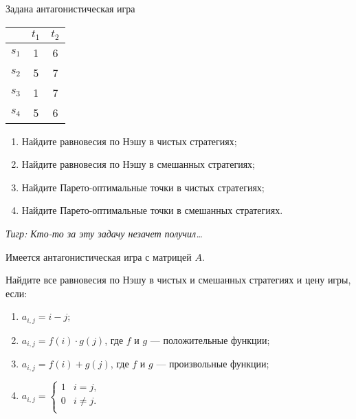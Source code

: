 \begin{problem}

Задана антагонистическая игра\par
\begin{tabular}{|c|c|c|}
\hline
& $t_{1}$ & $t_{2}$ \\
\hline
$s_{1}$ & 1 & 6 \\
$s_{2}$ & 5 & 7 \\
$s_{3}$ & 1 & 7 \\
$s_{4}$ & 5 & 6 \\
\hline
\end{tabular}
\begin{enumerate}
\item	Найдите равновесия по Нэшу в чистых стратегиях;\par
\item 	Найдите равновесия по Нэшу в смешанных стратегиях;\par
\item 	Найдите Парето-оптимальные точки в чистых стратегиях;\par
\item Найдите Парето-оптимальные точки в смешанных стратегиях.\par
\end{enumerate}
{\it Тигр: Кто-то за эту задачу незачет получил\ldots }



\begin{sol}

\end{sol}
\end{problem}



\begin{problem}
 Имеется антагонистическая игра с матрицей $A$.

Найдите все равновесия по Нэшу в чистых и смешанных стратегиях и
цену игры, если:

\begin{enumerate}
\item $a_{i,j}=i-j;$

\item $a_{i,j}=f(i)\cdot g(j)$, где $f$ и $g$ --- положительные функции;

\item $a_{i,j}=f(i)+g(j)$, где $f$ и $g$ --- произвольные функции;

\item $a_{i,j}=\left\{
\begin{array}{cc}
  1 & i=j, \\
  0 & i\neq j. \\
\end{array}\right.$
\end{enumerate}


\begin{sol}

\end{sol}
\end{problem}


